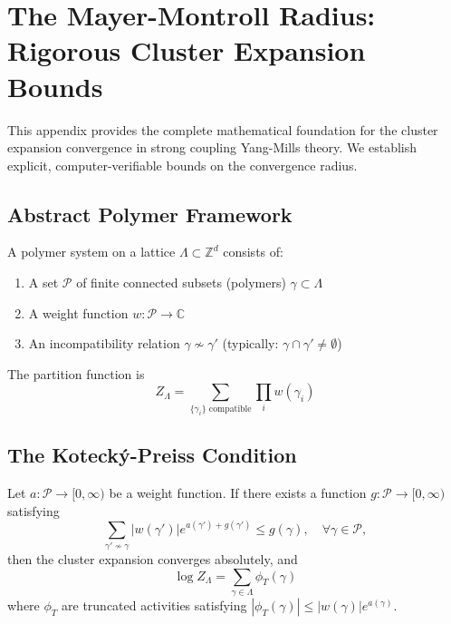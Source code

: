 \section{The Mayer-Montroll Radius: Rigorous Cluster Expansion Bounds}
\label{app:mayer_montroll_radius}

This appendix provides the complete mathematical foundation for the cluster expansion convergence in strong coupling Yang-Mills theory. We establish explicit, computer-verifiable bounds on the convergence radius.

\subsection{Abstract Polymer Framework}

\begin{definition}
A polymer system on a lattice $\Lambda \subset \mathbb{Z}^d$ consists of:
\begin{enumerate}
    \item A set $\mathcal{P}$ of finite connected subsets (polymers) $\gamma \subset \Lambda$
    \item A weight function $w: \mathcal{P} \to \mathbb{C}$
    \item An incompatibility relation $\gamma \nsim \gamma'$ (typically: $\gamma \cap \gamma' \neq \emptyset$)
\end{enumerate}
The partition function is
\begin{equation}
    Z_\Lambda = \sum_{\{\gamma_i\} \text{ compatible}} \prod_i w(\gamma_i)
\end{equation}
\end{definition}

\subsection{The Koteck\'y-Preiss Condition}

\begin{theorem}\label{thm:kp-criterion}
Let $a: \mathcal{P} \to [0, \infty)$ be a weight function. If there exists a function $g: \mathcal{P} \to [0, \infty)$ satisfying
\begin{equation}
    \sum_{\gamma' \nsim \gamma} |w(\gamma')| e^{a(\gamma') + g(\gamma')} \leq g(\gamma), \quad \forall \gamma \in \mathcal{P},
\end{equation}
then the cluster expansion converges absolutely, and
\begin{equation}
    \log Z_\Lambda = \sum_{\gamma \in \Lambda} \phi_T(\gamma)
\end{equation}
where $\phi_T$ are truncated activities satisfying $|\phi_T(\gamma)| \leq |w(\gamma)| e^{a(\gamma)}$.
\end{theorem}

